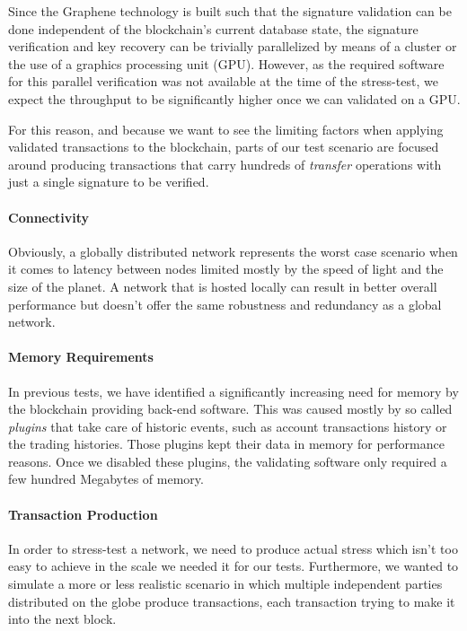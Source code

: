 Since the Graphene technology is built such that the signature validation can
be done independent of the blockchain's current database state, the signature
verification and key recovery can be trivially parallelized by means of a
cluster or the use of a graphics processing unit (GPU). However, as the
required software for this parallel verification was not available at the time
of the stress-test, we expect the throughput to be significantly higher once we
can validated on a GPU.

For this reason, and because we want to see the limiting factors when applying
validated transactions to the blockchain, parts of our test scenario are
focused around producing transactions that carry hundreds of \emph{transfer}
operations with just a single signature to be verified.

\paragraph{Connectivity}
Obviously, a globally distributed network represents the worst case scenario
when it comes to latency between nodes limited mostly by the speed of light and
the size of the planet. A network that is hosted locally can result in better
overall performance but doesn't offer the same robustness and redundancy as a
global network.

\paragraph{Memory Requirements}
In previous tests, we have identified a significantly increasing need for
memory by the blockchain providing back-end software. This was caused mostly by
so called \emph{plugins} that take care of historic events, such as account
transactions history or the trading histories. Those plugins kept their data in
memory for performance reasons. Once we disabled these plugins, the validating
software only required a few hundred Megabytes of memory.

\paragraph{Transaction Production}
In order to stress-test a network, we need to produce actual stress which isn't
too easy to achieve in the scale we needed it for our tests. Furthermore, we
wanted to simulate a more or less realistic scenario in which multiple
independent parties distributed on the globe produce transactions, each
transaction trying to make it into the next block.

